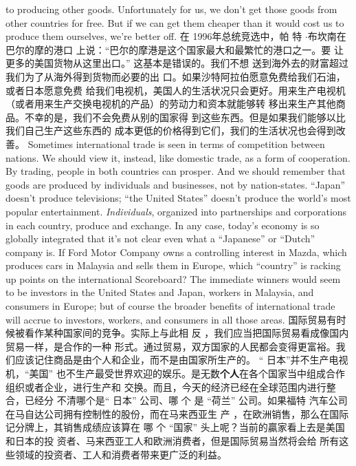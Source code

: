 \begin{paracol}{2}
to producing other goods. Unfortunately for us, we don't get
those goods from other countries for free. But if we can get
them cheaper than it would cost us to produce them ourselves,
we're better off.
\switchcolumn
在 1996年总统竞选中，帕 特 $\cdot$布坎南在巴尔的摩的港口
上说：“巴尔的摩港是这个国家最大和最繁忙的港口之一。要
让更多的美国货物从这里出口。” 这基本是错误的。我们不想
送到海外去的财富超过我们为了从海外得到货物而必要的出
口。如果沙特阿拉伯愿意免费给我们石油，或者日本愿意免费
给我们电视机，美国人的生活状况只会更好。用来生产电视机
（或者用来生产交换电视机的产品）的劳动力和资本就能够转
移出来生产其他商品。不幸的是，我们不会免费从别的国家得
到这些东西。但是如果我们能够以比我们自己生产这些东西的
成本更低的价格得到它们，我们的生活状况也会得到改善。
\switchcolumn*
Sometimes international trade is seen in terms of competition between nations. We should view it, instead, like domestic
trade, as a form of cooperation. By trading, people in both
countries can prosper. And we should remember that goods are
produced by individuals and businesses, not by nation-states.
``Japan'' doesn't produce televisions; ``the United States'' doesn't
produce the world's most popular entertainment. \textit{Individuals},
organized into partnerships and corporations in each country,
produce and exchange. In any case, today's economy is so globally integrated that it's not clear even what a ``Japanese'' or
``Dutch'' company is. If Ford Motor Company owns a controlling interest in Mazda, which produces cars in Malaysia and
sells them in Europe, which ``country'' is racking up points on
the international Scoreboard? The immediate winners would
seem to be investors in the United States and Japan, workers in
Malaysia, and consumers in Europe; but of course the broader
benefits of international trade will accrue to investors, workers,
and consumers in all those areas.
\switchcolumn
国际贸易有时候被看作某种国家间的竞争。实际上与此相
反 ，我们应当把国际贸易看成像国内贸易一样，是合作的一种
形式。通过贸易，双方国家的人民都会变得更富裕。我们应该记住商品是由个人和企业，而不是由国家所生产的。 “ 日本”并不生产电视机，“美国” 也不生产最受世界欢迎的娱乐。是无数\textbf{个人}在各个国家当中组成合作组织或者企业，进行生产和
交换。而且，今天的经济已经在全球范围内进行整合，已经分
不清哪个是“ 日本” 公司、哪 个 是 “荷兰” 公司。如果福特
汽车公司在马自达公司拥有控制性的股份，而在马来西亚生
产 ，在欧洲销售，那么在国际记分牌上，其销售成绩应该算在
哪 个 “国家” 头上呢？当前的贏家看上去是美国和日本的投
资者、马来西亚工人和欧洲消费者，但是国际贸易当然将会给
所有这些领域的投资者、工人和消费者带来更广泛的利益。

\end{paracol}
